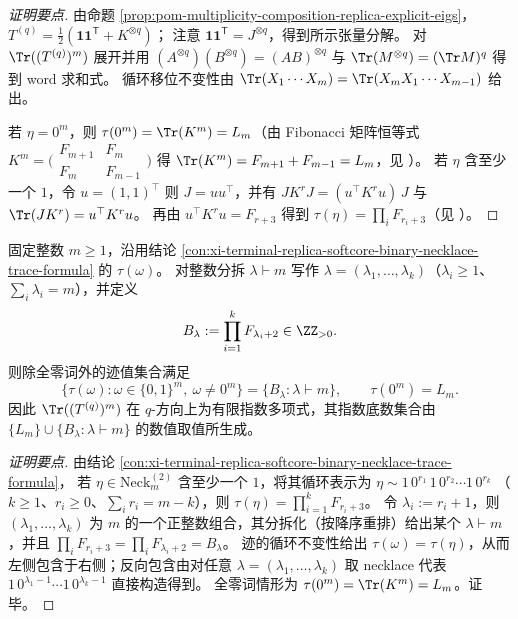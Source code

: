 \begin{proof}[证明要点]
由命题 \ref{prop:pom-multiplicity-composition-replica-explicit-eigs}，
\(
T^{(q)}=\frac12(\mathbf{1}\mathbf{1}^{\mathsf T}+K^{\otimes q})
\)；
注意 \(\mathbf{1}\mathbf{1}^{\mathsf T}=J^{\otimes q}\)，得到所示张量分解。
对 \(\Tr((T^{(q)})^m)\) 展开并用 \((A^{\otimes q})(B^{\otimes q})=(AB)^{\otimes q}\) 与 \(\Tr(M^{\otimes q})=(\Tr M)^q\) 得到 word 求和式。
循环移位不变性由 \(\Tr(X_1\cdots X_m)=\Tr(X_mX_1\cdots X_{m-1})\) 给出。
\par
若 \(\eta=0^m\)，则 \(\tau(0^m)=\Tr(K^m)=L_m\)（由 Fibonacci 矩阵恒等式 \(K^m=\bigl(\begin{smallmatrix}F_{m+1}&F_m\\ F_m&F_{m-1}\end{smallmatrix}\bigr)\) 得 \(\Tr(K^m)=F_{m+1}+F_{m-1}=L_m\)，见 \cite{FQFibonacciLucasChap11Matrices,MSEFibonacciMatrices784710}）。
若 \(\eta\) 含至少一个 \(1\)，令 \(u=(1,1)^{\top}\) 则 \(J=uu^{\top}\)，并有
\(
J K^{r} J=(u^{\top}K^{r}u)\,J
\)
与
\(
\Tr(JK^{r})=u^{\top}K^{r}u
\)。
再由 \(u^{\top}K^{r}u=F_{r+3}\) 得到 \(\tau(\eta)=\prod_i F_{r_i+3}\)（见 \cite{FQFibonacciLucasChap11Matrices}）。
\end{proof}







\begin{conclusion}\label{con:xi-terminal-replica-softcore-trace-partition-image}
固定整数 \(m\ge 1\)，沿用结论 \ref{con:xi-terminal-replica-softcore-binary-necklace-trace-formula} 的 \(\tau(\omega)\)。
对整数分拆 \(\lambda\vdash m\) 写作 \(\lambda=(\lambda_1,\dots,\lambda_k)\)（\(\lambda_i\ge 1\)、\(\sum_i\lambda_i=m\)），并定义
\[
B_\lambda:=\prod_{i=1}^{k}F_{\lambda_i+2}\in\ZZ_{>0}.
\]
则除全零词外的迹值集合满足
\[
\{\tau(\omega):\omega\in\{0,1\}^m,\ \omega\neq 0^m\}
=\{B_\lambda:\lambda\vdash m\},
\qquad
\tau(0^m)=L_m.
\]
因此 \(\Tr((T^{(q)})^m)\) 在 \(q\)-方向上为有限指数多项式，其指数底数集合由 \(\{L_m\}\cup\{B_\lambda:\lambda\vdash m\}\) 的数值取值所生成。
\end{conclusion}
\begin{proof}[证明要点]
由结论 \ref{con:xi-terminal-replica-softcore-binary-necklace-trace-formula}，
若 \(\eta\in\mathrm{Neck}_m^{(2)}\) 含至少一个 \(1\)，将其循环表示为
\(
\eta\sim 1\,0^{r_1}\,1\,0^{r_2}\cdots 1\,0^{r_k}
\)
（\(k\ge 1\)、\(r_i\ge 0\)、\(\sum_i r_i=m-k\)），则
\(
\tau(\eta)=\prod_{i=1}^{k}F_{r_i+3}
\)。
令 \(\lambda_i:=r_i+1\)，则 \((\lambda_1,\dots,\lambda_k)\) 为 \(m\) 的一个正整数组合，其分拆化（按降序重排）给出某个 \(\lambda\vdash m\)，并且
\(
\prod_i F_{r_i+3}=\prod_i F_{\lambda_i+2}=B_\lambda
\)。
迹的循环不变性给出 \(\tau(\omega)=\tau(\eta)\)，从而左侧包含于右侧；反向包含由对任意 \(\lambda=(\lambda_1,\dots,\lambda_k)\) 取 necklace 代表
\(
1\,0^{\lambda_1-1}\cdots 1\,0^{\lambda_k-1}
\)
直接构造得到。
全零词情形为 \(\tau(0^m)=\Tr(K^m)=L_m\)。证毕。
\end{proof}

